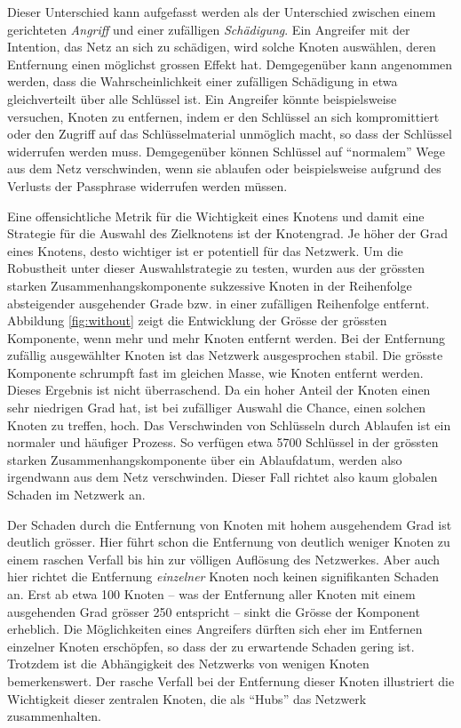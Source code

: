 Dieser Unterschied kann aufgefasst werden als der Unterschied zwischen
einem gerichteten \emph{Angriff} und einer zuf\"alligen
\emph{Sch\"adigung}. Ein Angreifer mit der Intention, das Netz an sich
zu sch\"adigen, wird solche Knoten ausw\"ahlen, deren Entfernung einen
m\"oglichst grossen Effekt hat. Demgegen\"uber kann angenommen werden,
dass die Wahrscheinlichkeit einer zuf\"alligen Sch\"adigung in etwa
gleichverteilt \"uber alle Schl\"ussel ist. Ein Angreifer k\"onnte
beispielsweise versuchen, Knoten zu entfernen, indem er den
Schl\"ussel an sich kompromittiert oder den Zugriff auf das
Schl\"usselmaterial unm\"oglich macht, so dass der Schl\"ussel
widerrufen werden muss. Demgegen\"uber k\"onnen Schl\"ussel auf
``normalem'' Wege aus dem Netz verschwinden, wenn sie ablaufen oder
beispielsweise aufgrund des Verlusts der Passphrase widerrufen werden
m\"ussen.

Eine offensichtliche Metrik f\"ur die Wichtigkeit eines Knotens und
damit eine Strategie f\"ur die Auswahl des Zielknotens ist der
Knotengrad. Je h\"oher der Grad eines Knotens, desto wichtiger ist er
potentiell f\"ur das Netzwerk. Um die Robustheit unter dieser
Auswahlstrategie zu testen, wurden aus der gr\"ossten starken
Zusammenhangskomponente sukzessive Knoten in der Reihenfolge
absteigender ausgehender Grade bzw. in einer zuf\"alligen Reihenfolge
entfernt. Abbildung \ref{fig:without} zeigt die Entwicklung der
Gr\"osse der gr\"ossten Komponente, wenn mehr und mehr Knoten entfernt
werden. Bei der Entfernung zuf\"allig ausgew\"ahlter Knoten ist das
Netzwerk ausgesprochen stabil. Die gr\"osste Komponente schrumpft fast
im gleichen Masse, wie Knoten entfernt werden. Dieses Ergebnis ist
nicht \"uberraschend. Da ein hoher Anteil der Knoten einen sehr
niedrigen Grad hat, ist bei zuf\"alliger Auswahl die Chance, einen
solchen Knoten zu treffen, hoch. Das Verschwinden von Schl\"usseln
durch Ablaufen ist ein normaler und h\"aufiger Prozess. So verf\"ugen
etwa 5700 Schl\"ussel in der gr\"ossten starken
Zusammenhangskomponente \"uber ein Ablaufdatum, werden also irgendwann
aus dem Netz verschwinden. Dieser Fall richtet also kaum globalen
Schaden im Netzwerk an.

Der Schaden durch die Entfernung von Knoten mit hohem ausgehendem Grad
ist deutlich gr\"osser. Hier f\"uhrt schon die Entfernung von deutlich
weniger Knoten zu einem raschen Verfall bis hin zur v\"olligen
Aufl\"osung des Netzwerkes. Aber auch hier richtet die Entfernung
\emph{einzelner} Knoten noch keinen signifikanten Schaden an. Erst ab
etwa 100 Knoten -- was der Entfernung aller Knoten mit einem
ausgehenden Grad gr\"osser 250 entspricht -- sinkt die Gr\"osse der
Komponent erheblich. Die M\"oglichkeiten eines Angreifers d\"urften
sich eher im Entfernen einzelner Knoten ersch\"opfen, so dass der zu
erwartende Schaden gering ist. Trotzdem ist die Abh\"angigkeit des
Netzwerks von wenigen Knoten bemerkenswert. Der rasche Verfall bei der
Entfernung dieser Knoten illustriert die Wichtigkeit dieser zentralen
Knoten, die als ``Hubs'' das Netzwerk zusammenhalten.


